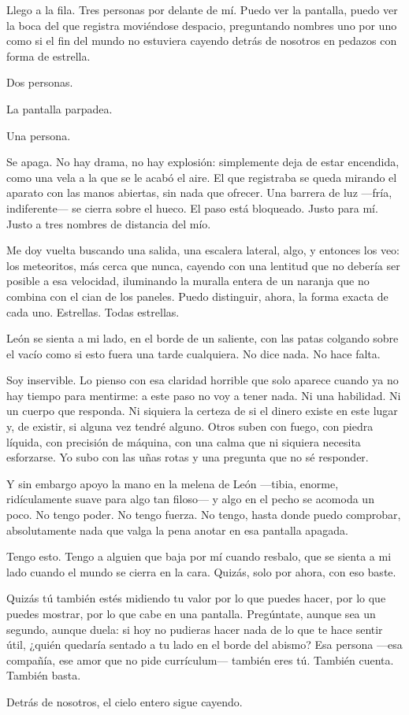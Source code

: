 Llego a la fila. Tres personas por delante de mí. Puedo ver la pantalla, puedo ver la boca del que registra moviéndose despacio, preguntando nombres uno por uno como si el fin del mundo no estuviera cayendo detrás de nosotros en pedazos con forma de estrella.

Dos personas.

La pantalla parpadea.

Una persona.

Se apaga. No hay drama, no hay explosión: simplemente deja de estar encendida, como una vela a la que se le acabó el aire. El que registraba se queda mirando el aparato con las manos abiertas, sin nada que ofrecer. Una barrera de luz —fría, indiferente— se cierra sobre el hueco. El paso está bloqueado. Justo para mí. Justo a tres nombres de distancia del mío.


Me doy vuelta buscando una salida, una escalera lateral, algo, y entonces los veo: los meteoritos, más cerca que nunca, cayendo con una lentitud que no debería ser posible a esa velocidad, iluminando la muralla entera de un naranja que no combina con el cian de los paneles. Puedo distinguir, ahora, la forma exacta de cada uno. Estrellas. Todas estrellas.

León se sienta a mi lado, en el borde de un saliente, con las patas colgando sobre el vacío como si esto fuera una tarde cualquiera. No dice nada. No hace falta.

Soy inservible. Lo pienso con esa claridad horrible que solo aparece cuando ya no hay tiempo para mentirme: a este paso no voy a tener nada. Ni una habilidad. Ni un cuerpo que responda. Ni siquiera la certeza de si el dinero existe en este lugar y, de existir, si alguna vez tendré alguno. Otros suben con fuego, con piedra líquida, con precisión de máquina, con una calma que ni siquiera necesita esforzarse. Yo subo con las uñas rotas y una pregunta que no sé responder.

Y sin embargo apoyo la mano en la melena de León —tibia, enorme, ridículamente suave para algo tan filoso— y algo en el pecho se acomoda un poco. No tengo poder. No tengo fuerza. No tengo, hasta donde puedo comprobar, absolutamente nada que valga la pena anotar en esa pantalla apagada.

Tengo esto. Tengo a alguien que baja por mí cuando resbalo, que se sienta a mi lado cuando el mundo se cierra en la cara. Quizás, solo por ahora, con eso baste.

Quizás tú también estés midiendo tu valor por lo que puedes hacer, por lo que puedes mostrar, por lo que cabe en una pantalla. Pregúntate, aunque sea un segundo, aunque duela: si hoy no pudieras hacer nada de lo que te hace sentir útil, ¿quién quedaría sentado a tu lado en el borde del abismo? Esa persona —esa compañía, ese amor que no pide currículum— también eres tú. También cuenta. También basta.

Detrás de nosotros, el cielo entero sigue cayendo.
